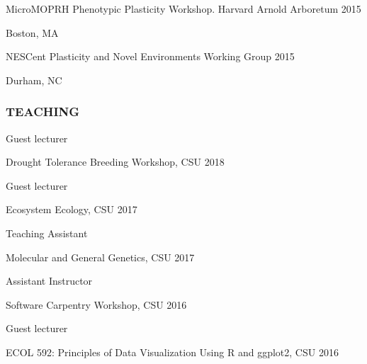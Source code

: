 \documentclass[12pt,english]{article}
\begin{document}
\hspace*{1.0em}MicroMOPRH Phenotypic Plasticity Workshop. Harvard Arnold Arboretum  \hfill 2015 \par
\hspace*{2.0em}Boston, MA  \par\vspace{0.5ex}

\hspace*{1.0em}NESCent Plasticity and Novel Environments Working Group  \hfill 2015 \par
\hspace*{2.0em}Durham, NC \par\vspace{0.5ex}


\subsubsection*{TEACHING}
\vspace{-0.5ex}\par
\hspace*{1.0em} Guest lecturer
\par
\hspace*{2.0em} Drought Tolerance Breeding Workshop, CSU
\hfill
2018
\par
\vspace{0.5em}
\hspace*{1.0em} Guest lecturer
\par
\hspace*{2.0em} Ecosystem Ecology, CSU
\hfill
2017
\par
\vspace{0.5em}
\hspace*{1.0em} Teaching Assistant
\par
\hspace*{2.0em} Molecular and General Genetics, CSU
\hfill
2017
\par
\vspace{0.5em}
\hspace*{1.0em} Assistant Instructor
\par
\hspace*{2.0em} Software Carpentry Workshop, CSU
\hfill
2016
\par
\vspace{0.5em}
\hspace*{1.0em} Guest lecturer
\par
\hspace*{2.0em} ECOL 592: Principles of Data Visualization Using R and ggplot2, CSU
\hfill
2016
\vspace{0.5em}
\par
\end{document}
